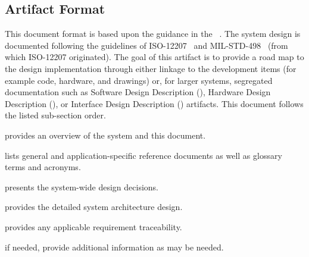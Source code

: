 
\subsection{Artifact Format}
\label{loc:DocOverview_ArtifactFormat}

This document format is based upon the guidance in the \SSDD{} \DID~\cite{ref__SSDD_DID}.
The system design is documented following the guidelines of ISO-12207~\cite{ref__ISO_12207} and MIL-STD-498~\cite{ref__MIL_STD_498} (from which ISO-12207 originated).
The goal of this artifact is to provide a road map to the design implementation through either linkage to the development items (for example code, hardware, and \CAD drawings) or, for larger systems, segregated documentation such as Software Design Description (\SDD), Hardware Design Description (\HWDD), or Interface Design Description (\IDD) artifacts.
This document follows the listed \SSDD sub-section order.
\begin{description}[itemindent=5pt,topsep=0pt,itemsep=0pt,partopsep=0pt, parsep=0pt]
	\item[Section 1] provides an overview of the system and this document.
	\item[Section 2] lists general and application-specific reference documents as well as glossary terms and acronyms. 
	\item[Section 3] presents the system-wide design decisions.
	\item[Section 4] provides the detailed system architecture design. 
	\item[Section 5] provides any applicable requirement traceability.
	\item[Appendices] if needed, provide additional information as may be needed.
\end{description}


